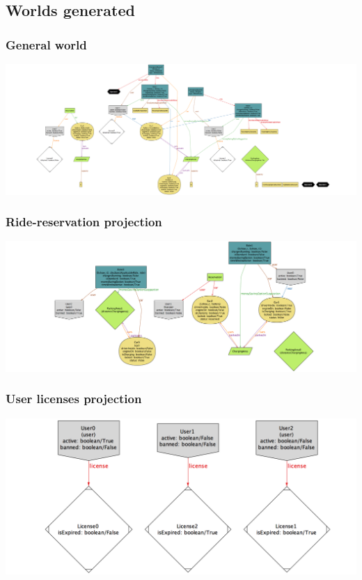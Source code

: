 	\begin{landscape}
	
	\subsection{Worlds generated}
	
		\subsubsection{General world}
			\includegraphics[width=2\textwidth, center]{img/world1.png}
	
		\subsubsection{Ride-reservation projection}
			\includegraphics[width=2\textwidth, center]{img/rides_reservations.png}
	
		\subsubsection{User licenses projection}
			\includegraphics[width=2\textwidth, center]{img/user_licenses.png}
		

\end{landscape}
